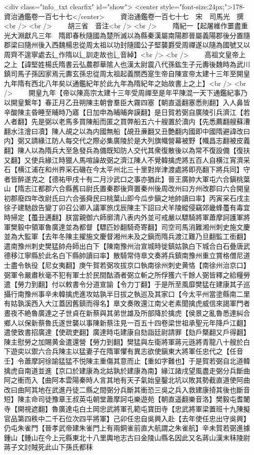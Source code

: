 <div class="info_txt clearfix" id="show">
<center style="font-size:24px;">178-資治通鑑卷一百七十七</center>
  　　資治通鑑卷一百七十七　宋　司馬光　撰<br />
<br />
　　胡三省　音注<br />
<br />
　　隋紀一【起屠維作噩盡重光大淵獻凡三年　隋即春秋隨國為楚所滅以為縣秦漢屬南陽郡晉屬義陽郡後分置隨郡梁曰隨州後入西魏楊忠從周太祖以功封隨國公子堅襲爵受周禪遂以隨為國號又以周齊不遑寧處去辶作隋以辶訓走故也辶音綽】<br />
<br />
　　高祖文皇帝上之上【諱堅姓楊氏隋書云弘農郡華隂人也漢太尉震八代孫鈜生子元夀後魏時為武川鎮司馬子孫因家焉元夀玄孫忠從周太祖起義關西寔生帝自陳宣帝太建十三年至開皇九年隋有西北八年矣以通鑑紀年於此九年為隋紀年之始故書上之上】<br />
<br />
　　開皇九年【帝以陳高宗太建十三年受周禪至是年平陳混一天下通鑑紀事乃以開皇繋年】春正月乙丑朔陳主朝會羣臣大霧四塞【朝直遥翻塞悉則翻】入人鼻皆辛酸陳主昏睡至晡時乃寤【日加申為晡晡奔謨翻】是日賀若弼自廣陵引兵濟江【若人者翻】先是弼以老馬多買陳船而匿之買弊船五六十艘置於瀆内【先悉薦翻艘蘇漕翻水注澮曰凟】陳人覘之以為内國無船【覘丑亷翻又丑艶翻内國即中國隋避諱改曰内】弼又請緣江防人每交代之際必集廣陵於是大列旗幟營幕被野【幟昌志翻被皮義翻】陳人以為隋兵大至急發兵為備既知防人交代其衆復散後以為常不復設備【復扶又翻】又使兵緣江時獵人馬喧譟故弼之濟江陳人不覺韓擒虎將五百人自横江宵濟采石【横江浦在和州界采石磯在今太平州北三十里對岸津渡處將即亮翻下將兵同】守者皆醉遂克之【德祐甲戌十有二月沙武口之事亦猶此】晉王廣帥大軍屯六合鎭桃葉山【隋志江都郡六合縣舊曰尉氏置秦郡後齊置秦州後周改州曰方州改郡曰六合開皇初郡廢四年改尉氏曰六合張舜民曰桃葉山即今瓜步鎭之地帥讀曰率】丙寅采石戌主徐子建馳啟告變丁卯召公卿入議軍旅戊辰陳主下詔曰犬羊陵縱侵竊郊畿蜂蠆有毒宜時掃定【蠆丑邁翻】朕當親御六師廓清八表内外並可戒嚴以驃騎將軍蕭摩訶護軍將軍樊毅中領軍魯廣達並為都督【驃匹妙翻騎奇寄翻】司空司馬消難湘州刺史施文慶並為大監軍【去年冬陳主擢施文慶督湘州未及之鎭而隋兵渡江難乃旦翻監工銜翻】遣南豫州刺史樊猛帥舟師出白下【陳南豫州治宣城時徙鎮姑孰白下城合白石疊唐武德移江寧縣於此名白下縣帥讀曰率】散騎常侍臯文奏將兵鎮南豫州重立賞格僧尼道士盡令執役【尼女夷翻】庚午賀若弼攻拔京口執南徐州刺史黄恪【南徐州治京口】弼軍令嚴肅秋毫不犯有軍士於民間酤酒者弼立斬之所俘獲六千餘人弼皆釋之給糧勞遣【勞力到翻】付以敕書令分道宣諭【令力丁翻】于是所至風靡樊猛在建康其子巡攝行南豫州事辛未韓擒虎進攻姑孰半日拔之執巡及其家口【今太平州當塗縣南二里有姑孰溪西入大江蓋因舊鎮而得名】臯文奏敗還江南父老素聞擒虎威信來謁軍門者晝夜不絶魯廣達之子世貞在新蔡與其弟世雄及所部降於擒虎【侯景之亂魯悉達糾合鄉人以保新蔡魯氏遂世襲以事陳新蔡注見一百五十四卷梁世祖承聖元年降戶江翻】遣使致書招廣達【使疏吏翻】廣達時屯建康自劾詣廷尉請罪【劾戶槩翻又戶得翻】陳主慰勞之加賜黄金遣還營【勞力到翻】樊猛與左衛將軍蔣元遜將青龍八十艘於白下遊奕以禦六合兵陳主以猛妻子在隋軍懼有異志欲使鎭東大將軍任忠代之【任音壬】令蕭摩訶徐諭猛猛不悦陳主重傷其意而止【重如字難也】于是賀若弼自北道韓擒虎自南道並進【京口於建康為北姑孰於建康為南】緣江諸戌望風盡走弼分兵斷曲阿之衝而入【曲阿本雲陽秦時人言其地有天子氣始皇鑿北坑以敗其勢截直道使阿曲改曰曲阿其地在武進丹徒二縣之間弼分兵斷其衝恐三吳之兵入救建康掎其後也斷音短】陳主命司徒豫章王叔英屯朝堂蕭摩訶屯樂遊苑【朝直遥翻樂音洛】樊毅屯耆闍寺【開視遮翻】魯廣達屯白土岡忠武將軍孔範屯寶田寺【忠武將軍梁置班十九陳擬官品第四秩中二千石位次四平將軍】己卯任忠自吳興入赴【去年使任忠出守吳興】仍屯朱雀門【晉孝武帝建朱雀門上有兩銅雀前直大航謂之朱雀航】辛未賀若弼進據鍾山【鍾山在今上元縣東北十八里輿地志古曰金陵山縣名因此又名蔣山漢末秣陵尉蔣子文討賊死此山下孫氏都秣